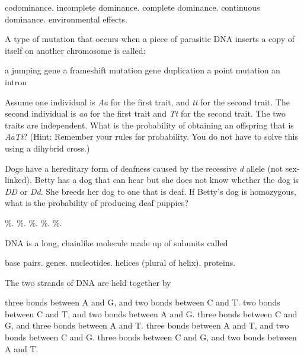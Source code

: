 \begin{choices}
\correctchoice codominance.
\choice incomplete dominance.
\choice complete dominance.
\choice continuous dominance.
\choice environmental effects.
\end{choices}

\newpage

\question
A type of mutation that occurs when a piece of parasitic DNA inserts a copy of itself on another chromosome is called:

\begin{choices}
\correctchoice a jumping gene
\choice a frameshift mutation
\choice gene duplication
\choice a point mutation
\choice an intron
\end{choices}

\question
Assume one individual is \textit{Aa} for the first trait, and \textit{tt} for the second trait. The second individual is \textit{aa} for the first trait and \textit{Tt} for the second trait. The two traits are independent.  What is the probability of obtaining an offspring that is \textit{AaTt}? (Hint: Remember your rules for probability. You do not have to solve this using a dihybrid cross.)

\begin{choices}
\end{choices}

\question
Dogs have a hereditary form of deafness caused by the recessive \textit{d} allele (not sex-linked).  Betty has a dog that can hear but she does not know whether the dog is \textit{DD} or \textit{Dd}.  She breeds her dog to one that is deaf.  If Betty's dog is homozygous, what is the probability of producing deaf puppies?

\begin{choices}
\%.
\%.
\%.
\%.
\%.
\end{choices}

\question
DNA is a long, chainlike molecule made up of subunits called

\begin{choices}
\choice base pairs.
\choice genes.
\correctchoice nucleotides.
\choice helices (plural of helix).
\choice proteins.
\end{choices}

\question
The two strands of DNA are held together by

\begin{choices}
\choice three bonds between A and G, and two bonds between C and T.
\choice two bonds between C and T, and two bonds between A and G.
\choice three bonds between C and G, and three bonds between A and T.
\choice three bonds between A and T, and two bonds between C and G.
\correctchoice three bonds between C and G, and two bonds between A and T.
\end{choices}


